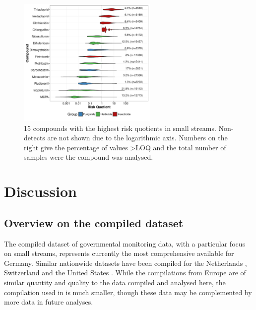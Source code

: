 \documentclass[journal=esthag,manuscript=article]{achemso}
\begin{document}
\begin{figure}[ht]
  \includegraphics[width=0.6\textwidth]{figure6.pdf}
  \caption{15 compounds with the highest risk quotients in small streams. Non-detects are not shown due to the logarithmic axis. Numbers on the right give the percentage of values \textgreater LOQ and the total number of samples were the compound was analysed.
  }
  \label{fig:fig6}
\end{figure}




\section{Discussion}
\subsection{Overview on the compiled dataset}
The compiled dataset of governmental monitoring data, with a particular focus on small streams, represents currently the most comprehensive available for Germany.
Similar nationwide datasets have been compiled for the Netherlands \citep{vijver_spatial_2008}, Switzerland \citep{munz_pestizidmessungen_2011} and the United States \citep{stone2014pesticides}.
While the compilations from Europe are of similar quantity and quality to the  data compiled and analysed here, the compilation used in \citet{stone2014pesticides} is much smaller, though these data may be complemented by more data in future analyses. 
\end{document}

